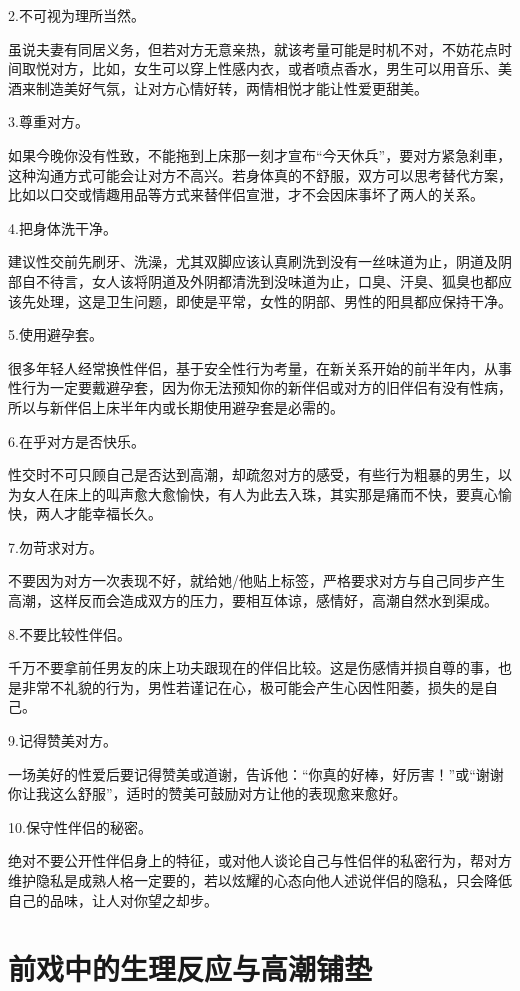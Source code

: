 \documentclass[12pt,UTF8]{ctexbook}
\begin{document}
2.不可视为理所当然。

虽说夫妻有同居义务，但若对方无意亲热，就该考量可能是时机不对，不妨花点时间取悦对方，比如，女生可以穿上性感内衣，或者喷点香水，男生可以用音乐、美酒来制造美好气氛，让对方心情好转，两情相悦才能让性爱更甜美。

3.尊重对方。

如果今晚你没有性致，不能拖到上床那一刻才宣布“今天休兵”，要对方紧急刹車，这种沟通方式可能会让对方不高兴。若身体真的不舒服，双方可以思考替代方案，比如以口交或情趣用品等方式来替伴侣宣泄，才不会因床事坏了两人的关系。

4.把身体洗干净。

建议性交前先刷牙、洗澡，尤其双脚应该认真刷洗到没有一丝味道为止，阴道及阴部自不待言，女人该将阴道及外阴都清洗到没味道为止，口臭、汗臭、狐臭也都应该先处理，这是卫生问题，即使是平常，女性的阴部、男性的阳具都应保持干净。

5.使用避孕套。

很多年轻人经常换性伴侣，基于安全性行为考量，在新关系开始的前半年内，从事性行为一定要戴避孕套，因为你无法预知你的新伴侣或对方的旧伴侣有没有性病，所以与新伴侣上床半年内或长期使用避孕套是必需的。

6.在乎对方是否快乐。

性交时不可只顾自己是否达到高潮，却疏忽对方的感受，有些行为粗暴的男生，以为女人在床上的叫声愈大愈愉快，有人为此去入珠，其实那是痛而不快，要真心愉快，两人才能幸福长久。

7.勿苛求对方。

不要因为对方一次表现不好，就给她/他贴上标签，严格要求对方与自己同步产生高潮，这样反而会造成双方的压力，要相互体谅，感情好，高潮自然水到渠成。

8.不要比较性伴侣。

千万不要拿前任男友的床上功夫跟现在的伴侣比较。这是伤感情并损自尊的事，也是非常不礼貌的行为，男性若谨记在心，极可能会产生心因性阳萎，损失的是自己。

9.记得赞美对方。

一场美好的性爱后要记得赞美或道谢，告诉他：“你真的好棒，好厉害！”或“谢谢你让我这么舒服”，适时的赞美可鼓励对方让他的表现愈来愈好。

10.保守性伴侣的秘密。

绝对不要公开性伴侣身上的特征，或对他人谈论自己与性侣伴的私密行为，帮对方维护隐私是成熟人格一定要的，若以炫耀的心态向他人述说伴侣的隐私，只会降低自己的品味，让人对你望之却步。

\chapter{前戏中的生理反应与高潮铺垫}
\end{document}
